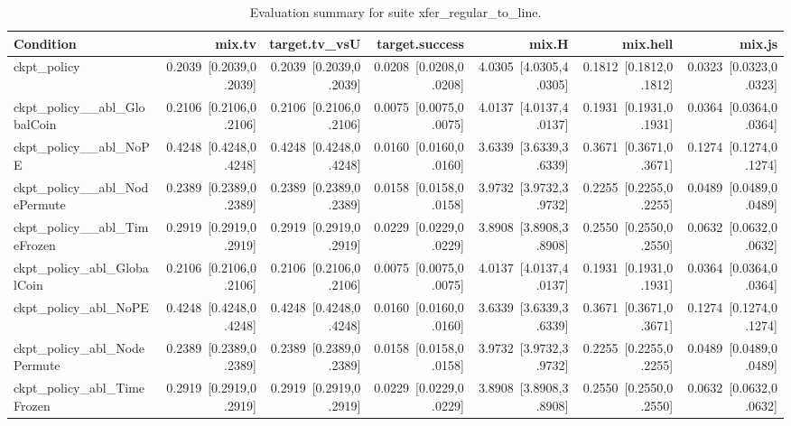 \begin{table}[t]
\centering
\caption{Evaluation summary for suite xfer_regular_to_line.}
\label{tab:eval_xfer_regular_to_line}
\begin{tabular}{lrrrrrr}
\toprule
Condition & mix.tv & target.tv\_vsU & target.success & mix.H & mix.hell & mix.js \\
\midrule
ckpt\_policy & 0.2039~[0.2039,0.2039] & 0.2039~[0.2039,0.2039] & 0.0208~[0.0208,0.0208] & 4.0305~[4.0305,4.0305] & 0.1812~[0.1812,0.1812] & 0.0323~[0.0323,0.0323] \\
ckpt\_policy\_\_abl\_GlobalCoin & 0.2106~[0.2106,0.2106] & 0.2106~[0.2106,0.2106] & 0.0075~[0.0075,0.0075] & 4.0137~[4.0137,4.0137] & 0.1931~[0.1931,0.1931] & 0.0364~[0.0364,0.0364] \\
ckpt\_policy\_\_abl\_NoPE & 0.4248~[0.4248,0.4248] & 0.4248~[0.4248,0.4248] & 0.0160~[0.0160,0.0160] & 3.6339~[3.6339,3.6339] & 0.3671~[0.3671,0.3671] & 0.1274~[0.1274,0.1274] \\
ckpt\_policy\_\_abl\_NodePermute & 0.2389~[0.2389,0.2389] & 0.2389~[0.2389,0.2389] & 0.0158~[0.0158,0.0158] & 3.9732~[3.9732,3.9732] & 0.2255~[0.2255,0.2255] & 0.0489~[0.0489,0.0489] \\
ckpt\_policy\_\_abl\_TimeFrozen & 0.2919~[0.2919,0.2919] & 0.2919~[0.2919,0.2919] & 0.0229~[0.0229,0.0229] & 3.8908~[3.8908,3.8908] & 0.2550~[0.2550,0.2550] & 0.0632~[0.0632,0.0632] \\
ckpt\_policy\_abl\_GlobalCoin & 0.2106~[0.2106,0.2106] & 0.2106~[0.2106,0.2106] & 0.0075~[0.0075,0.0075] & 4.0137~[4.0137,4.0137] & 0.1931~[0.1931,0.1931] & 0.0364~[0.0364,0.0364] \\
ckpt\_policy\_abl\_NoPE & 0.4248~[0.4248,0.4248] & 0.4248~[0.4248,0.4248] & 0.0160~[0.0160,0.0160] & 3.6339~[3.6339,3.6339] & 0.3671~[0.3671,0.3671] & 0.1274~[0.1274,0.1274] \\
ckpt\_policy\_abl\_NodePermute & 0.2389~[0.2389,0.2389] & 0.2389~[0.2389,0.2389] & 0.0158~[0.0158,0.0158] & 3.9732~[3.9732,3.9732] & 0.2255~[0.2255,0.2255] & 0.0489~[0.0489,0.0489] \\
ckpt\_policy\_abl\_TimeFrozen & 0.2919~[0.2919,0.2919] & 0.2919~[0.2919,0.2919] & 0.0229~[0.0229,0.0229] & 3.8908~[3.8908,3.8908] & 0.2550~[0.2550,0.2550] & 0.0632~[0.0632,0.0632] \\
\bottomrule
\end{tabular}
\end{table}
